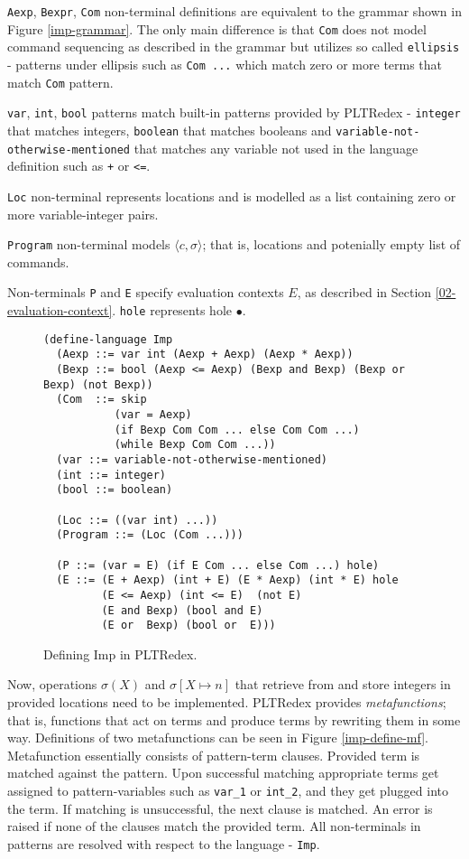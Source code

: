 \texttt{Aexp}, \texttt{Bexpr}, \texttt{Com} non-terminal definitions are equivalent to the grammar shown in Figure \ref{imp-grammar}. The only main difference is that \texttt{Com} does not model command sequencing as described in the grammar but utilizes so called \texttt{ellipsis} - patterns under ellipsis such as \texttt{Com ...} which match zero or more terms that match \texttt{Com} pattern.

\texttt{var}, \texttt{int}, \texttt{bool} patterns match built-in patterns provided by PLTRedex - \texttt{integer} that matches integers, \texttt{boolean} that matches booleans and \texttt{variable-not-otherwise-mentioned} that matches any variable not used in the language definition such as \texttt{+} or \texttt{<=}.

\texttt{Loc} non-terminal represents locations and is modelled as a list containing zero or more variable-integer pairs.

\texttt{Program} non-terminal models $\langle c, \sigma \rangle$; that is, locations and potenially empty list of commands.

Non-terminals \texttt{P} and \texttt{E} specify evaluation contexts $E$, as described in Section \ref{02-evaluation-context}. \texttt{hole} represents hole $\bullet$.

\begin{figure}[h]
\begin{verbatim}
(define-language Imp
  (Aexp ::= var int (Aexp + Aexp) (Aexp * Aexp))
  (Bexp ::= bool (Aexp <= Aexp) (Bexp and Bexp) (Bexp or Bexp) (not Bexp))
  (Com  ::= skip
           (var = Aexp)
           (if Bexp Com Com ... else Com Com ...)
           (while Bexp Com Com ...))
  (var ::= variable-not-otherwise-mentioned)
  (int ::= integer)
  (bool ::= boolean) 

  (Loc ::= ((var int) ...))
  (Program ::= (Loc (Com ...)))

  (P ::= (var = E) (if E Com ... else Com ...) hole)
  (E ::= (E + Aexp) (int + E) (E * Aexp) (int * E) hole 
         (E <= Aexp) (int <= E)  (not E)     
         (E and Bexp) (bool and E)
         (E or  Bexp) (bool or  E)))
\end{verbatim}
\caption{Defining Imp in PLTRedex.}
\label{imp-define-language}
\end{figure}

Now, operations $\sigma(X)$ and $\sigma[X \mapsto n]$ that retrieve from and store integers in provided locations need to be implemented. PLTRedex provides \textit{metafunctions}; that is, functions that act on terms and produce terms by rewriting them in some way. Definitions of two metafunctions can be seen in Figure \ref{imp-define-mf}. Metafunction essentially consists of pattern-term clauses. Provided term is matched against the pattern. Upon successful matching appropriate terms get assigned to pattern-variables such as \texttt{var\_1} or \texttt{int\_2}, and they get plugged into the term. If matching is unsuccessful, the next clause is matched. An error is raised if none of the clauses match the provided term. All non-terminals in patterns are resolved with respect to the language - \texttt{Imp}.

